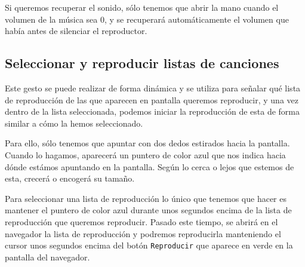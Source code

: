 \documentclass[10pt,a4paper,spanish]{article}
\begin{document}
Si queremos recuperar el sonido, sólo tenemos que abrir la mano cuando el volumen de la música sea 0, y se recuperará automáticamente el volumen que había antes de silenciar el reproductor.



\subsection{\textcolor{verde}Seleccionar y reproducir listas de canciones}

Este gesto se puede realizar de forma dinámica y se utiliza para señalar qué lista de reproducción de las que aparecen en pantalla queremos reproducir, y una vez dentro de la lista seleccionada, podemos iniciar la reproducción de esta de forma similar a cómo la hemos seleccionado.

Para ello, sólo tenemos que apuntar con dos dedos estirados hacia la pantalla. Cuando lo hagamos, aparecerá un puntero de color azul que nos indica hacia dónde estámos apuntando en la pantalla. Según lo cerca o lejos que estemos de esta, crecerá o encogerá su tamaño.

Para seleccionar una lista de reproducción lo único que tenemos que hacer es mantener el puntero de color azul durante unos segundos encima de la lista de reproducción que queremos reproducir. Pasado este tiempo, se abrirá en el navegador la lista de reproducción y podremos reproducirla manteniendo el cursor unos segundos encima del botón \texttt{Reproducir} que aparece en verde en la pantalla del navegador. 
\end{document}
